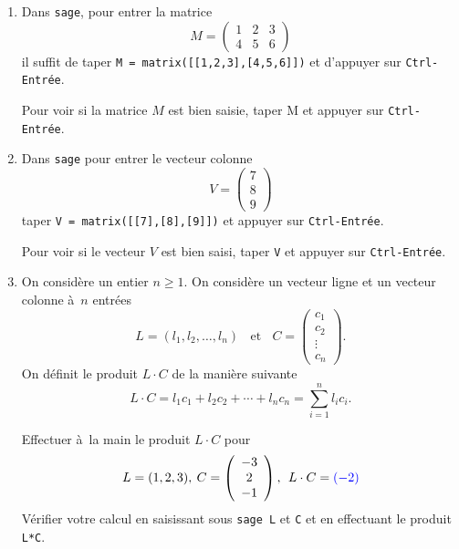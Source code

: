 \documentclass[a4paper,12pt]{article}
\newcommand{\add}[1]{\textcolor{blue}{#1}}
\begin{document}
\begin{exercice}
    \begin{enumerate}
        \item Dans {\tt sage}, pour entrer la matrice
            $$M = \left(\begin{array}{ccc}
                1 & 2 & 3 \\
                4 & 5 & 6
            \end{array} \right)
            $$
            il suffit de taper {\tt M = matrix([[1,2,3],[4,5,6]])} et d'appuyer sur {\tt Ctrl-Entrée}.

            Pour voir si la matrice $M$ est bien saisie, taper M et appuyer sur {\tt Ctrl-Entrée}.

                 \item Dans {\tt sage} pour entrer le vecteur colonne 
            $$V= \left( \begin{array}{c} 7 \\ 8 \\ 9 \end{array} \right)$$
            taper {\tt V = matrix([[7],[8],[9]])} et appuyer sur {\tt Ctrl-Entrée}.

            Pour voir si le vecteur $V$ est bien saisi, taper {\tt V} et appuyer sur {\tt Ctrl-Entrée}.
        \item On considère un entier $n\geqslant 1$. On considère un vecteur ligne et un vecteur colonne à $n$ entrées
            $$
            L=(l_1,l_2,\dots,l_n)\:\:\:\:\text{et}\:\:\:\:
            C= \left(\begin{array}{c} c_1 \\ c_2 \\ \vdots \\ c_n \end{array}\right).$$
            On définit le produit $L\cdot C$ de la manière suivante 
            $$ L \cdot C = l_1c_1 + l_2c_2 + \cdots + l_n c_n = \sum_{i=1}^{n} l_i c_i.$$

            Effectuer à la main le produit $L\cdot C$ pour
            $$L=(1,2,3),\:C=\left(\begin{array}{c} -3 \\ 2 \\ -1 \end{array}\right),\:\: L\cdot C = \add{(-2)}$$
            Vérifier votre calcul en saisissant sous {\tt sage L} et {\tt C} et en effectuant le produit {\tt L*C}.



\end{enumerate}
\end{exercice}
\end{document}
